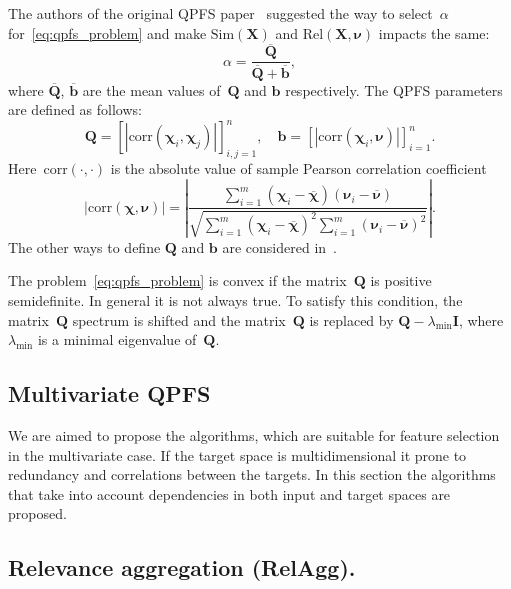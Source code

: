 \documentclass[12pt,twoside]{article}
\theoremstyle{definition}
\newcommand{\bb}{\mathbf{b}}
\newcommand{\bX}{\mathbf{X}}
\newcommand{\bQ}{\mathbf{Q}}
\newcommand{\bchi}{\boldsymbol{\chi}}
\newcommand{\bnu}{\boldsymbol{\nu}}
\begin{document}
The authors of the original QPFS paper~\cite{rodriguez2010quadratic} suggested the way to select~$\alpha$ for~\eqref{eq:qpfs_problem} and make $\text{Sim}(\bX)$ and $\text{Rel}(\bX, \bnu)$ impacts the same:
\begin{equation*}
\alpha = \frac{\overline{\bQ}}{\overline{\bQ} + \overline{\bb}},
\end{equation*}
where $\overline{\bQ}$, $\overline{\bb}$ are the mean values of~$\bQ$ and $\bb$ respectively. The QPFS parameters are defined as follows:
\begin{equation}
\bQ = \left[|\text{corr}(\bchi_i, \bchi_j)|\right]_{i,j=1}^n, \quad \bb = \left[|\text{corr}(\bchi_i, \bnu)|\right]_{i=1}^n.
\label{eq:qpfs_1d_qb}
\end{equation}
Here~$\text{corr}(\cdot, \cdot)$ is the absolute value of sample Pearson correlation coefficient
\begin{equation*}
|\text{corr}(\bchi, \bnu)| = \left|\frac{\sum_{i=1}^m(\bchi_i - \overline{\bchi})( \bnu_i - \overline{\bnu})}{\sqrt{\sum_{i=1}^m(\bchi_i - \overline{\bchi})^2\sum_{i=1}^m(\bnu_i - \overline{\bnu})^2}}\right|.
\end{equation*}
The other ways to define $\bQ$ and $\bb$ are considered in~\cite{katrutsa2017comprehensive}.

The problem~\eqref{eq:qpfs_problem} is convex if the matrix~$\bQ$ is positive semidefinite. In general it is not always true.
To satisfy this condition, the matrix~$\bQ$ spectrum is shifted and the matrix~$\bQ$ is replaced by $\bQ - \lambda_{\text{min}} \mathbf{I}$, where $\lambda_{\text{min}} $ is a minimal eigenvalue of~$\bQ$.

\subsection{Multivariate QPFS}

We are aimed to propose the algorithms, which are suitable for feature selection in the multivariate case. 
If the target space is multidimensional it prone to redundancy and correlations between the targets. 
In this section the algorithms that take into account dependencies in both input and target spaces are proposed.

\subsection{Relevance aggregation (RelAgg).}
\end{document}
